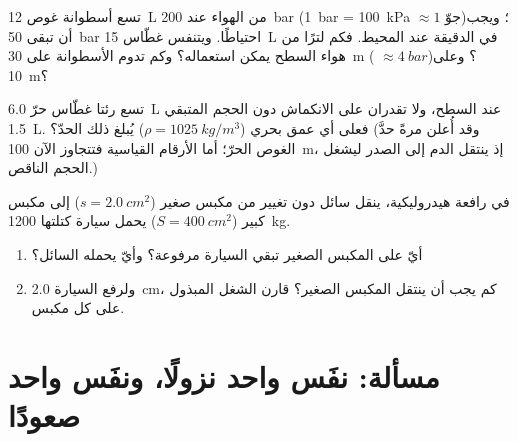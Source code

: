 \begin{exercise}[$\star\star\star$]\label{exo:g10:pressure:13}
تسع أسطوانة غوص \qty{12}{L} من الهواء عند \qty{200}{bar}
(\qty{1}{bar} = \qty{100}{kPa} $\approx 1$ جوّ)؛ ويجب أن تبقى \qty{50}{bar}
احتياطًا. ويتنفس غطّاس \qty{15}{L} في الدقيقة عند
 المحيط. فكم لترًا من هواء  السطح يمكن استعماله؟
وكم تدوم الأسطوانة على \qty{30}{m} (
$\approx \qty{4}{bar}$)؟ وعلى \qty{10}{m}؟
\end{exercise}

\begin{exercise}[$\star\star\star$]\label{exo:g10:pressure:14}
تسع رئتا غطّاس حرّ \qty{6.0}{L} عند السطح، ولا تقدران على
الانكماش دون الحجم المتبقي \qty{1.5}{L}. فعلى أي عمق بحري
($\rho = \qty{1025}{kg/m^3}$) يُبلغ ذلك الحدّ؟ (وقد أُعلن مرةً
حدَّ الغوص الحرّ؛ أما الأرقام القياسية فتتجاوز الآن \qty{100}{m}، إذ ينتقل
الدم إلى الصدر ليشغل الحجم الناقص.)
\end{exercise}

\begin{exercise}[$\star\star\star$]\label{exo:g10:pressure:15}
في رافعة هيدروليكية، ينقل سائل  دون تغيير من
مكبس صغير ($s = \qty{2.0}{cm^2}$) إلى مكبس كبير
($S = \qty{400}{cm^2}$) يحمل سيارة كتلتها \qty{1200}{kg}.
\begin{enumerate}
  \item أيّ  على المكبس الصغير تبقي السيارة مرفوعة؟ وأيّ 
        يحمله السائل؟
  \item ولرفع السيارة \qty{2.0}{cm}، كم يجب أن ينتقل المكبس
        الصغير؟ قارن الشغل المبذول على كل مكبس.
\end{enumerate}
\end{exercise}

\section{مسألة: نفَس واحد نزولًا، ونفَس واحد صعودًا}

